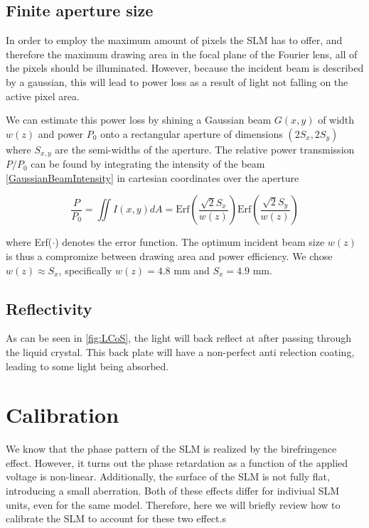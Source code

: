 \subsection{Finite aperture size}

In order to employ the maximum amount of pixels the SLM has to offer, and therefore the maximum drawing area in the focal plane of the Fourier lens, all of the pixels should be illuminated. However, because the incident beam is described by a gaussian, this will lead to power loss as a result of light not falling on the active pixel area. 
    
We can estimate this power loss by shining a Gaussian beam $G(x,y)$ of width $w(z)$ and power $P_0$ onto a rectangular aperture of dimensions $(2S_x, 2S_y)$ where $S_{x,y}$ are the semi-widths of the aperture. The relative power transmission $P/P_0$ can be found by integrating the intensity of the beam \cref{GaussianBeamIntensity} in cartesian coordinates over the aperture

\begin{equation}\label{RectAperturePower}
    \frac{P}{P_0} =
    \iint I(x,y) dA=
    \text{Erf}\left(\frac{\sqrt{2}S_x}{w(z)}\right) \text{Erf}\left(\frac{\sqrt{2}S_y}{w(z)}\right)
\end{equation}

where Erf($\cdot$) denotes the error function. The optimum incident beam size $w(z)$ is thus a compromize between drawing area and power efficiency. We chose $w(z) \approx S_{x}$, specifically $w(z) = 4.8$ mm and $S_x = 4.9$ mm. 

\subsection{Reflectivity}

As can be seen in \cref{fig:LCoS}, the light will back reflect at after passing through the liquid crystal. This back plate will have a non-perfect anti relection coating, leading to some light being absorbed. 


\section{Calibration}

We know that the phase pattern of the SLM is realized by the birefringence effect. However, it turns out the phase retardation as a function of the applied voltage is non-linear. Additionally, the surface of the SLM is not fully flat, introducing a small aberration. Both of these effects differ for indiviual SLM units, even for the same model. Therefore, here we will briefly review how to calibrate the SLM to account for these two effect.s 

